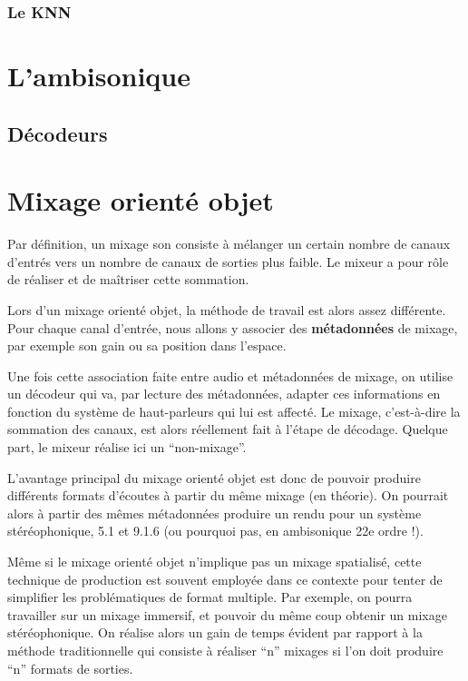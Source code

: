 \documentclass[
  letterpaper,
  DIV=11,
  numbers=noendperiod]{scrreprt}
\begin{document}
\hypertarget{le-knn}{%
\subsection{Le KNN}\label{le-knn}}

\hypertarget{lambisonique}{%
\chapter{L'ambisonique}\label{lambisonique}}

\hypertarget{HOA-decode-allrad}{%
\section{Décodeurs}\label{HOA-decode-allrad}}

\hypertarget{mixage-orientuxe9-objet}{%
\chapter{Mixage orienté objet}\label{mixage-orientuxe9-objet}}

Par définition, un mixage son consiste à mélanger un certain nombre de
canaux d'entrés vers un nombre de canaux de sorties plus faible. Le
mixeur a pour rôle de réaliser et de maîtriser cette sommation.

Lors d'un mixage orienté objet, la méthode de travail est alors assez
différente. Pour chaque canal d'entrée, nous allons y associer des
\textbf{métadonnées} de mixage, par exemple son gain ou sa position dans
l'espace.

Une fois cette association faite entre audio et métadonnées de mixage,
on utilise un décodeur qui va, par lecture des métadonnées, adapter ces
informations en fonction du système de haut-parleurs qui lui est
affecté. Le mixage, c'est-à-dire la sommation des canaux, est alors
réellement fait à l'étape de décodage. Quelque part, le mixeur réalise
ici un ``non-mixage''.

L'avantage principal du mixage orienté objet est donc de pouvoir
produire différents formats d'écoutes à partir du même mixage (en
théorie). On pourrait alors à partir des mêmes métadonnées produire un
rendu pour un système stéréophonique, 5.1 et 9.1.6 (ou pourquoi pas, en
ambisonique 22e ordre !).

Même si le mixage orienté objet n'implique pas un mixage spatialisé,
cette technique de production est souvent employée dans ce contexte pour
tenter de simplifier les problématiques de format multiple. Par exemple,
on pourra travailler sur un mixage immersif, et pouvoir du même coup
obtenir un mixage stéréophonique. On réalise alors un gain de temps
évident par rapport à la méthode traditionnelle qui consiste à réaliser
``n'' mixages si l'on doit produire ``n'' formats de sorties.
\end{document}
